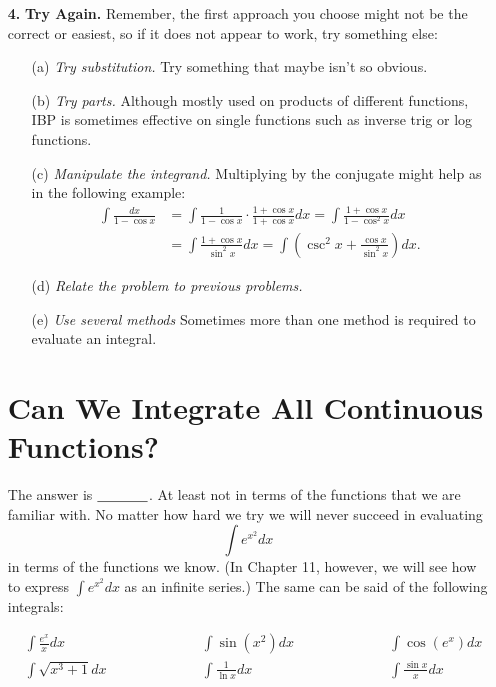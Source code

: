 \documentclass[paper=a4, fontsize=11pt]{scrartcl} %
\numberwithin{equation}{section} %
\numberwithin{figure}{section} %
\numberwithin{table}{section} %
\newcommand{\ds}{\displaystyle}
\begin{document}
\begin{enumerate}
\item[\textbf{4.}] \textbf{Try Again.} Remember, the first approach you choose might not be the correct or easiest, so if it does not appear to work, try something else:\\
\begin{enumerate}
\item[(a)] \textit{Try substitution.} Try something that maybe isn't so obvious.\\
\item[(b)] \textit{Try parts.} Although mostly used on products of different functions, IBP is sometimes effective on single functions such as inverse trig or log functions.\\
\item[(c)] \textit{Manipulate the integrand.} Multiplying by the conjugate might help as in the following example:
\begin{align*}
\ds\int\ds\frac{dx}{1-\cos x} &= \ds\int \ds\frac{1}{1-\cos x }\cdot \ds\frac{1+\cos x}{1+\cos x} dx = \ds\int \ds\frac{1+\cos x}{1-\cos^2 x}dx\\
&= \ds\int \ds\frac{1+\cos x}{\sin^2 x}dx = \ds\int\left(\csc^2 x + \ds\frac{\cos x}{\sin^2 x}\right) dx.
\end{align*}
\item[(d)] \textit{Relate the problem to previous problems.}\\
\item[(e)] \textit{Use several methods} Sometimes more than one method is required to evaluate an integral.\\
\end{enumerate}

\section*{Can We Integrate All Continuous Functions?}

The answer is $\underline{\hspace{0.5in}}$. At least not in terms of the functions that we are familiar with. No matter how hard we try we will never succeed in evaluating 
\[\ds\int e^{x^2} dx\]
in terms of the functions we know. (In Chapter 11, however, we will see how to express $\ds\int e^{x^2} dx$ as an infinite series.) The same can be said of the following integrals:

\[\begin{array}{rlll}
&\ds\int \ds\frac{e^x}{x}dx \hspace{1in}  &\ds\int \sin(x^2)dx \hspace{1in} & \ds\int \cos(e^x)dx\\
&\ds\int \ds\sqrt{x^3+1}dx \hspace{1in} & \ds\int \ds\frac{1}{\ln x}dx \hspace{1in} & \ds\int \ds\frac{\sin x}{x} dx\\
\end{array}\]
\indent



\end{enumerate}
\end{document}
